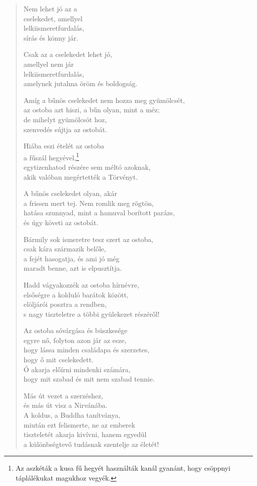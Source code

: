 \begin{verse}
 Nem lehet jó az a\\
cselekedet, amellyel\\
lelkiismeretfurdalás,\\
sírás és könny jár.

 Csak az a cselekedet lehet jó,\\
amellyel nem jár\\
lelkiismeretfurdalás,\\
amelynek jutalma öröm és boldogság.

 Amíg a bűnös cselekedet nem hozza meg gyümölcsét,\\
az ostoba azt hiszi, a bűn olyan, mint a méz;\\
de mihelyt gyümölcsöt hoz,\\
szenvedés sújtja az ostobát.

 Hiába eszi ételét az ostoba\\
a fűszál hegyével,\footnote{Az aszkéták a kusa fű hegyét használták kanál gyanánt, hogy csöppnyi táplálékukat magukhoz vegyék.}\\
egytizenhatod részére sem méltó azoknak,\\
akik valóban megértették a Törvényt.

 A bűnös cselekedet olyan, akár\\
a frissen mert tej. Nem romlik meg rögtön,\\
hatása szunnyad, mint a hamuval borított parázs,\\
és úgy követi az ostobát.

 Bármily sok ismeretre tesz szert az ostoba,\\
csak kára származik belőle,\\
a fejét hasogatja, és ami jó még\\
maradt benne, azt is elpusztítja.

 Hadd vágyakozzék az ostoba hírnévre,\\
elsőségre a kolduló barátok között,\\
elöljárói posztra a rendben,\\
s nagy tiszteletre a többi gyülekezet részéről!

 Az ostoba sóvárgása és büszkesége\\
egyre nő, folyton azon jár az esze,\\
hogy lássa minden családapa és szerzetes,\\
hogy ő mit cselekedett.\\
Ő akarja előírni mindenki számára,\\
hogy mit szabad és mit nem szabad tennie.

 Más út vezet a szerzéshez,\\
és más út visz a Nirvánába.\\
A koldus, a Buddha tanítványa,\\
miután ezt felismerte, ne az emberek\\
tiszteletét akarja kivívni, hanem egyedül\\
a különbségtevő tudásnak szentelje az életét!

\end{verse}

